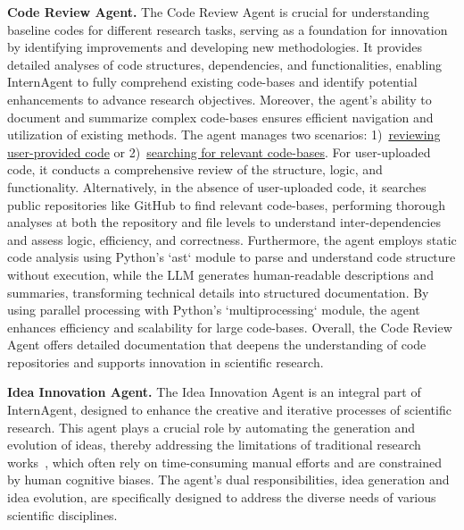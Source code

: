\noindent \textbf{Code Review Agent.} 
\label{sec:code_review_agent}
The Code Review Agent is crucial for understanding baseline codes for different research tasks, serving as a foundation for innovation by identifying improvements and developing new methodologies. It provides detailed analyses of code structures, dependencies, and functionalities, enabling InternAgent to fully comprehend existing code-bases and identify potential enhancements to advance research objectives. Moreover, the agent's ability to document and summarize complex code-bases ensures efficient navigation and utilization of existing methods. The agent manages two scenarios: 1)~\underline{reviewing user-provided code} or 2)~\underline{searching for relevant code-bases}. For user-uploaded code, it conducts a comprehensive review of the structure, logic, and functionality. Alternatively, in the absence of user-uploaded code, it searches public repositories like GitHub to find relevant code-bases, performing thorough analyses at both the repository and file levels to understand inter-dependencies and assess logic, efficiency, and correctness. Furthermore, the agent employs static code analysis using Python's `ast` module to parse and understand code structure without execution, while the LLM generates human-readable descriptions and summaries, transforming technical details into structured documentation. By using parallel processing with Python's `multiprocessing` module, the agent enhances efficiency and scalability for large code-bases. Overall, the Code Review Agent offers detailed documentation that deepens the understanding of code repositories and supports innovation in scientific research.

\noindent \textbf{Idea Innovation Agent.}
\label{sec:idea_innovation_agent}
The Idea Innovation Agent is an integral part of InternAgent, designed to enhance the creative and iterative processes of scientific research. This agent plays a crucial role by automating the generation and evolution of ideas, thereby addressing the limitations of traditional research works~\citep{yuan2025dolphin, yamada2025ai, lu2024ai}, which often rely on time-consuming manual efforts and are constrained by human cognitive biases. The agent's dual responsibilities, idea generation and idea evolution, are specifically designed to address the diverse needs of various scientific disciplines.


